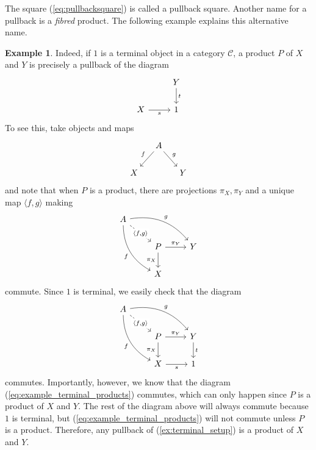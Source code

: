 \documentclass[10pt,oneside]{book}
\def\~#1{\mathscr{#1}}
\theoremstyle{plain}
\theoremstyle{definition}
\newtheorem{ex}[thm]{Example}
\theoremstyle{remark}
\numberwithin{equation}{section}
\numberwithin{figure}{section}
\begin{document}
The square (\ref{eq:pullbacksquare}) is called a pullback square. Another name for a pullback is a \emph{fibred} product. The following example explains this alternative name.

\begin{ex}
    Indeed, if $1$ is a terminal object in a category $\~C$, a product $P$ of $X$ and $Y$ is precisely a pullback of the diagram
    \begin{equation}
    \label{ex:terminal_setup}
        \begin{tikzcd}
            & Y \\
            X & 1
            \arrow["s"', from=2-1, to=2-2]
            \arrow["t", from=1-2, to=2-2]
        \end{tikzcd}
    \end{equation}
    To see this, take objects and maps 
    \[\begin{tikzcd}[column sep=small]
            & A \arrow[dl, "f", swap] \arrow[dr, "g"] & \\
            X & & Y
    \end{tikzcd}\]
    and note that when $P$ is a product, there are projections $\pi_X, \pi_Y$ and a unique map $\langle f, g \rangle$ making 
    \begin{equation}
    \label{eq:example_terminal_products}
        \begin{tikzcd}
        A \arrow[rd, "{\langle f, g \rangle}" description, dashed] \arrow[rdd, "f", bend right, swap] \arrow[rrd, "g", bend left] &                                      &   \\
                                                                                                                  & P \arrow[r, "\pi_Y"] \arrow[d, "\pi_X"'] & Y \\
                                                                                                                  & X                                    &  
        \end{tikzcd}
    \end{equation}
    commute. Since $1$ is terminal, we easily check that the diagram
    \[
        \begin{tikzcd}
            A \\
            & P & Y \\
            & X & 1
            \arrow["{\langle f, g \rangle}"{description}, dashed, from=1-1, to=2-2]
            \arrow["{\pi_X}"', from=2-2, to=3-2]
            \arrow["{\pi_Y}", from=2-2, to=2-3]
            \arrow["s"', from=3-2, to=3-3]
            \arrow["t", from=2-3, to=3-3]
            \arrow["{f}"', bend right, from=1-1, to=3-2]
            \arrow["{g}", bend left, from=1-1, to=2-3]
        \end{tikzcd}
    \]
    commutes. Importantly, however, we know that the diagram (\ref{eq:example_terminal_products}) commutes, which can only happen since $P$ is a product of $X$ and $Y$. The rest of the diagram above will always commute because $1$ is terminal, but (\ref{eq:example_terminal_products}) will not commute unless $P$ is a product. Therefore, any pullback of (\ref{ex:terminal_setup}) is a product of $X$ and $Y$.
\end{ex}
\end{document}
